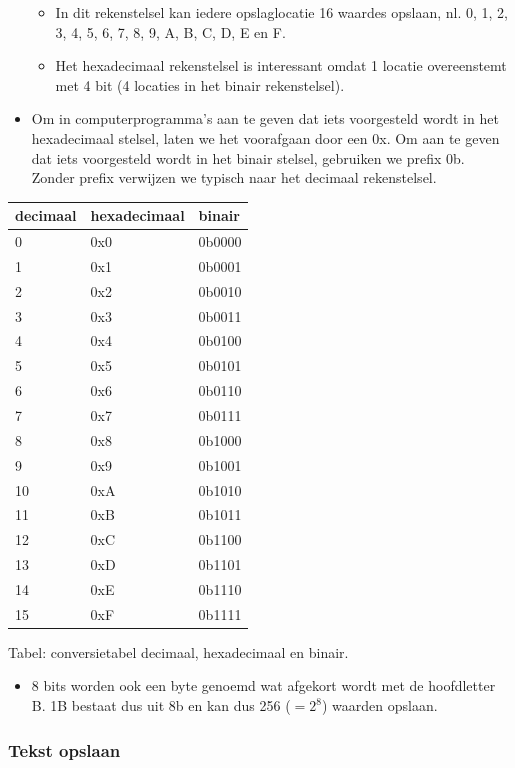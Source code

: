 \documentclass[]{tufte-book}
\providecommand{\tightlist}{%
  \setlength{\itemsep}{0pt}\setlength{\parskip}{0pt}}
\begin{document}
\begin{itemize}
  \begin{itemize}
  \tightlist
  \item
    In dit rekenstelsel kan iedere opslaglocatie 16 waardes opslaan, nl. 0, 1, 2, 3, 4, 5, 6, 7, 8, 9, A, B, C, D, E en F.
  \item
    Het hexadecimaal rekenstelsel is interessant omdat 1 locatie overeenstemt met 4 bit (4 locaties in het binair rekenstelsel).
  \end{itemize}
\item
  Om in computerprogramma's aan te geven dat iets voorgesteld wordt in het hexadecimaal stelsel, laten we het voorafgaan door een 0x. Om aan te geven dat iets voorgesteld wordt in het binair stelsel, gebruiken we prefix 0b. Zonder prefix verwijzen we typisch naar het decimaal rekenstelsel.
\end{itemize}

\begin{longtable}[]{@{}lll@{}}
\toprule
decimaal & hexadecimaal & binair\tabularnewline
\midrule
\endhead
0 & 0x0 & 0b0000\tabularnewline
1 & 0x1 & 0b0001\tabularnewline
2 & 0x2 & 0b0010\tabularnewline
3 & 0x3 & 0b0011\tabularnewline
4 & 0x4 & 0b0100\tabularnewline
5 & 0x5 & 0b0101\tabularnewline
6 & 0x6 & 0b0110\tabularnewline
7 & 0x7 & 0b0111\tabularnewline
8 & 0x8 & 0b1000\tabularnewline
9 & 0x9 & 0b1001\tabularnewline
10 & 0xA & 0b1010\tabularnewline
11 & 0xB & 0b1011\tabularnewline
12 & 0xC & 0b1100\tabularnewline
13 & 0xD & 0b1101\tabularnewline
14 & 0xE & 0b1110\tabularnewline
15 & 0xF & 0b1111\tabularnewline
\bottomrule
\end{longtable}

Tabel: conversietabel decimaal, hexadecimaal en binair.

\begin{itemize}
\tightlist
\item
  8 bits worden ook een byte genoemd wat afgekort wordt met de hoofdletter B. 1B bestaat dus uit 8b en kan dus 256 (\(=2^8\)) waarden opslaan.
\end{itemize}

\hypertarget{tekst-opslaan}{%
\subsubsection{Tekst opslaan}\label{tekst-opslaan}}
\end{document}
